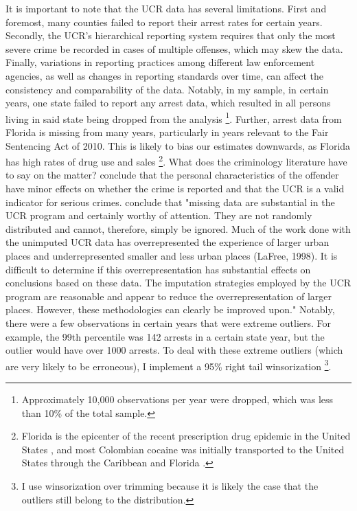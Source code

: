 \documentclass{article}
\begin{document}
It is important to note that the UCR data has several limitations. First and foremost, many counties failed to report their arrest rates for certain years. Secondly, the UCR's hierarchical reporting system requires that only the most severe crime be recorded in cases of multiple offenses, which may skew the data. Finally, variations in reporting practices among different law enforcement agencies, as well as changes in reporting standards over time, can affect the consistency and comparability of the data. Notably, in my sample, in certain years, one state failed to report any arrest data, which resulted in all persons living in said state being dropped from the analysis \footnote{Approximately 10,000 observations per year were dropped, which was less than 10\% of the total sample.}. Further, arrest data from Florida is missing from many years, particularly in years relevant to the Fair Sentencing Act of 2010. This is likely to bias our estimates downwards, as Florida has high rates of drug use and sales \footnote{Florida is the epicenter of the recent prescription drug epidemic in the United States \citep{lee}, and most Colombian cocaine was initially transported to the United States through the Caribbean and Florida \citep{williams}.}.  What does the criminology literature have to say on the matter? \cite{gove} conclude that the personal characteristics of the offender have minor effects on whether the crime is reported and that the UCR is a valid indicator for serious crimes. \cite{lynch} conclude that "missing data are substantial in the UCR program and certainly worthy of attention. They are not randomly distributed and cannot, therefore, simply be ignored. Much of the work done with the unimputed UCR data has overrepresented the experience of larger urban places and underrepresented smaller and less urban places (LaFree, 1998). It is difficult to determine if this overrepresentation has substantial effects on conclusions based on these data. The imputation strategies employed by the UCR program are reasonable and appear to reduce the overrepresentation of larger places. However, these methodologies can clearly be improved upon." Notably, there were a few observations in certain years that were extreme outliers. For example, the 99th percentile was 142 arrests in a certain state year, but the outlier would have over 1000 arrests. To deal with these extreme outliers (which are very likely to be erroneous), I implement a 95\% right tail winsorization \footnote{I use winsorization over trimming because it is likely the case that the outliers still belong to the distribution.}. 
\end{document}
